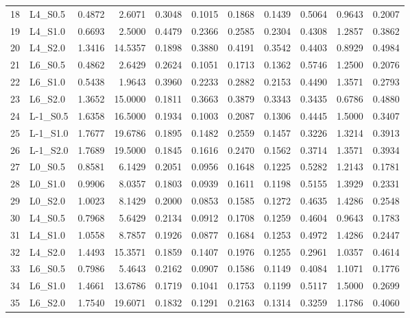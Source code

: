 \begin{tabular}{llrrrrrrrrr}
18 & L4_S0.5 & 0.4872 & 2.6071 & 0.3048 & 0.1015 & 0.1868 & 0.1439 & 0.5064 & 0.9643 & 0.2007 \\
19 & L4_S1.0 & 0.6693 & 2.5000 & 0.4479 & 0.2366 & 0.2585 & 0.2304 & 0.4308 & 1.2857 & 0.3862 \\
20 & L4_S2.0 & 1.3416 & 14.5357 & 0.1898 & 0.3880 & 0.4191 & 0.3542 & 0.4403 & 0.8929 & 0.4984 \\
21 & L6_S0.5 & 0.4862 & 2.6429 & 0.2624 & 0.1051 & 0.1713 & 0.1362 & 0.5746 & 1.2500 & 0.2076 \\
22 & L6_S1.0 & 0.5438 & 1.9643 & 0.3960 & 0.2233 & 0.2882 & 0.2153 & 0.4490 & 1.3571 & 0.2793 \\
23 & L6_S2.0 & 1.3652 & 15.0000 & 0.1811 & 0.3663 & 0.3879 & 0.3343 & 0.3435 & 0.6786 & 0.4880 \\
24 & L-1_S0.5 & 1.6358 & 16.5000 & 0.1934 & 0.1003 & 0.2087 & 0.1306 & 0.4445 & 1.5000 & 0.3407 \\
25 & L-1_S1.0 & 1.7677 & 19.6786 & 0.1895 & 0.1482 & 0.2559 & 0.1457 & 0.3226 & 1.3214 & 0.3913 \\
26 & L-1_S2.0 & 1.7689 & 19.5000 & 0.1845 & 0.1616 & 0.2470 & 0.1562 & 0.3714 & 1.3571 & 0.3934 \\
27 & L0_S0.5 & 0.8581 & 6.1429 & 0.2051 & 0.0956 & 0.1648 & 0.1225 & 0.5282 & 1.2143 & 0.1781 \\
28 & L0_S1.0 & 0.9906 & 8.0357 & 0.1803 & 0.0939 & 0.1611 & 0.1198 & 0.5155 & 1.3929 & 0.2331 \\
29 & L0_S2.0 & 1.0023 & 8.1429 & 0.2000 & 0.0853 & 0.1585 & 0.1272 & 0.4635 & 1.4286 & 0.2548 \\
30 & L4_S0.5 & 0.7968 & 5.6429 & 0.2134 & 0.0912 & 0.1708 & 0.1259 & 0.4604 & 0.9643 & 0.1783 \\
31 & L4_S1.0 & 1.0558 & 8.7857 & 0.1926 & 0.0877 & 0.1684 & 0.1253 & 0.4972 & 1.4286 & 0.2447 \\
32 & L4_S2.0 & 1.4493 & 15.3571 & 0.1859 & 0.1407 & 0.1976 & 0.1255 & 0.2961 & 1.0357 & 0.4614 \\
33 & L6_S0.5 & 0.7986 & 5.4643 & 0.2162 & 0.0907 & 0.1586 & 0.1149 & 0.4084 & 1.1071 & 0.1776 \\
34 & L6_S1.0 & 1.4661 & 13.6786 & 0.1719 & 0.1041 & 0.1753 & 0.1199 & 0.5117 & 1.5000 & 0.2699 \\
35 & L6_S2.0 & 1.7540 & 19.6071 & 0.1832 & 0.1291 & 0.2163 & 0.1314 & 0.3259 & 1.1786 & 0.4060 \\
\bottomrule
\end{tabular}
